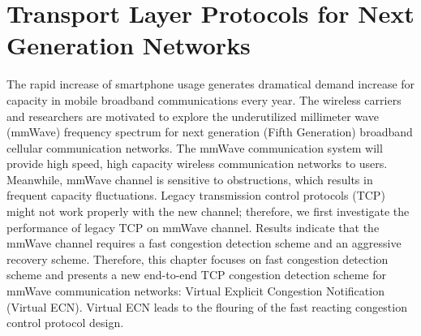 \chapter{Transport Layer Protocols for Next Generation Networks}\label{ch:5} 


\par The rapid increase of smartphone usage generates dramatical demand increase for capacity in mobile broadband communications every year. The wireless carriers and researchers are motivated to explore the underutilized millimeter wave (mmWave) frequency spectrum for next generation (Fifth Generation) broadband cellular communication networks. The mmWave communication system will provide high speed, high capacity wireless communication networks to users. Meanwhile, mmWave channel is sensitive to obstructions, which results in frequent capacity fluctuations. Legacy transmission control protocols (TCP) might not work properly with the new channel; therefore, we first investigate the performance of legacy TCP on mmWave channel. Results indicate that the mmWave channel requires a fast congestion detection scheme and an aggressive recovery scheme. Therefore, this chapter focuses on fast congestion detection scheme and presents a new end-to-end TCP congestion detection scheme for mmWave communication networks: Virtual Explicit Congestion Notification (Virtual ECN). Virtual ECN leads to the flouring of the fast reacting congestion control protocol design.

